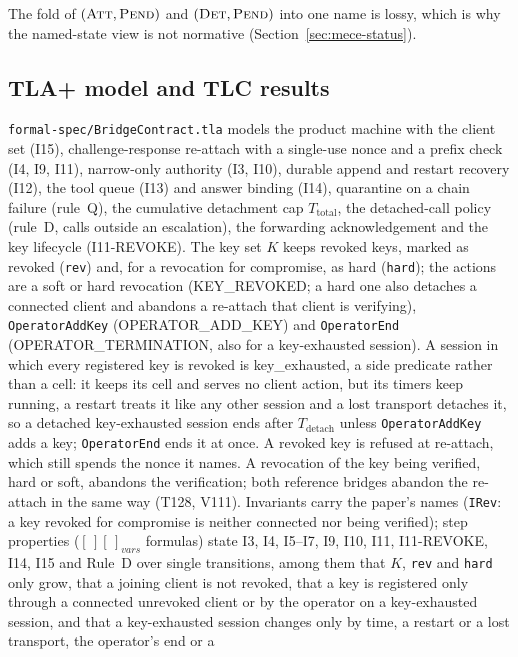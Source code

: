 The fold of $(\textsc{Att},\textsc{Pend})$ and $(\textsc{Det},\textsc{Pend})$
into one name is lossy, which is why the named-state view is not
normative (Section~\ref{sec:mece-status}).

\subsection{TLA+ model and TLC results}
\label{app:tla-extract}

\texttt{formal-spec/BridgeContract.tla} models the product machine with
the client set (I15), challenge-response re-attach with a single-use nonce
and a prefix check (I4, I9, I11), narrow-only authority (I3, I10), durable
append and restart recovery (I12), the tool queue (I13) and answer binding
(I14), quarantine on a chain failure (rule~Q), the cumulative detachment
cap $T_{\text{total}}$, the detached-call policy (rule~D, calls outside an
escalation), the forwarding acknowledgement and the key lifecycle
(I11-REVOKE). The key set $K$ keeps revoked keys, marked as revoked
(\texttt{rev}) and, for a revocation for compromise, as hard
(\texttt{hard}); the actions are a soft or hard revocation (KEY\_REVOKED; a
hard one also detaches a connected client and abandons a re-attach that
client is verifying), \texttt{OperatorAddKey} (OPERATOR\_ADD\_KEY) and
\texttt{OperatorEnd} (OPERATOR\_TERMINATION, also for a key-exhausted
session). A session in which every registered key is revoked is
key\_exhausted, a side predicate rather than a cell: it keeps its cell and
serves no client action, but its timers keep running, a restart treats it like
any other session and a lost transport detaches it, so a detached
key-exhausted session ends after $T_{\text{detach}}$ unless
\texttt{OperatorAddKey} adds a key; \texttt{OperatorEnd} ends it at once. A revoked key
is refused at re-attach, which still spends the nonce it names. A revocation of the
key being verified, hard or soft, abandons the verification; both reference
bridges abandon the re-attach in the same way (T128, V111). Invariants carry
the paper's names (\texttt{IRev}: a key revoked for compromise is neither
connected nor being verified); step properties
($[\,][\,]_{\mathit{vars}}$ formulas) state I3, I4, I5--I7, I9, I10, I11,
I11-REVOKE, I14, I15 and Rule~D over single transitions, among them that
$K$, \texttt{rev} and \texttt{hard} only grow, that a joining client is not
revoked, that a key is registered only through a connected unrevoked client or
by the operator on a key-exhausted session, and that a key-exhausted session
changes only by time, a restart or a lost transport, the operator's end or a
